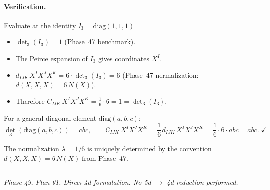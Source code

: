 \paragraph{Verification.}
Evaluate at the identity $I_3 = \mathrm{diag}(1,1,1)$:
\begin{itemize}
\item $\det_3(I_3) = 1$ (Phase~47 benchmark).
\item The Peirce expansion of $I_3$ gives coordinates $X^I$.
\item $d_{IJK}\, X^I X^J X^K = 6 \cdot \det_3(I_3) = 6$
  (Phase~47 normalization: $d(X,X,X) = 6\,N(X)$).
\item Therefore $C_{IJK}\, X^I X^J X^K = \tfrac{1}{6} \cdot 6 = 1
  = \det_3(I_3)$. \checkmark
\end{itemize}

For a general diagonal element $\mathrm{diag}(a,b,c)$:
\[
  \det_3(\mathrm{diag}(a,b,c)) = abc, \qquad
  C_{IJK}\, X^I X^J X^K = \frac{1}{6}\, d_{IJK}\, X^I X^J X^K
  = \frac{1}{6} \cdot 6 \cdot abc = abc. \; \checkmark
\]

The normalization $\lambda = 1/6$ is uniquely determined by the
convention $d(X,X,X) = 6\,N(X)$ from Phase~47.

\vspace{1em}
\hrule
\vspace{0.5em}
\textit{Phase 49, Plan 01. Direct 4d formulation.
No 5d $\to$ 4d reduction performed.}

